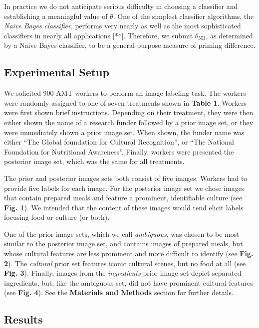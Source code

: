 \documentclass[a4paper]{report}
\begin{document}
In practice we do not anticipate serious difficulty in choosing a classifier
and establishing a meaningful value of $\theta$.  One of the simplest 
classifier algorithms, the \textit{Naive Bayes classifier}, performs very 
nearly as well as the most sophisticated classifiers in nearly all 
applications [**].  Therefore, we submit $\theta_\text{NB}$, as determined by 
a Naive Bayes classifier, to be a general-purpose measure of priming 
difference.  



\subsection*{Experimental Setup}
We solicited 900 AMT workers to perform an image labeling task.  The workers
were randomly assigned to one of seven treatments shown in 
\textbf{Table 1}.  Workers were first shown brief instructions.
Depending on their treatment, they were then either shown the name of 
a research funder followed by a prior image set, or they were immediately 
shown a prior image set. When shown, the funder name was either
``The Global foundation for Cultural Recognition'', or 
``The National Foundation for Nutritional Awareness''.  Finally, workers were 
presented the posterior image set, which was the same for all treatments.

The prior and posterior images sets both consist of five images. Workers had
to provide five labels for each image.  For the posterior image set we chose 
images that contain prepared meals and feature a prominent, identifiable 
culture (see \textbf{Fig. 1}).  We intended that the content of these images 
would tend elicit labels focusing food or culture (or both).

One of the prior image sets, which we call \textit{ambiguous}, was chosen to
be most similar to the posterior image set, and contains images of prepared
meals, but whose cultural features are less prominent and more difficult to
identify (see \textbf{Fig. 2}).  
The \textit{cultural} prior set features iconic cultural scenes, but no food 
at all (see \textbf{Fig. 3}).  Finally, images from
the \textit{ingredients} prior image set depict separated ingredients, but, 
like the ambiguous set, did not have prominent cultural features (see 
\textbf{Fig. 4}).  See the \textbf{Materials and Methods} section for further 
details.

\subsection*{Results}
\end{document}
